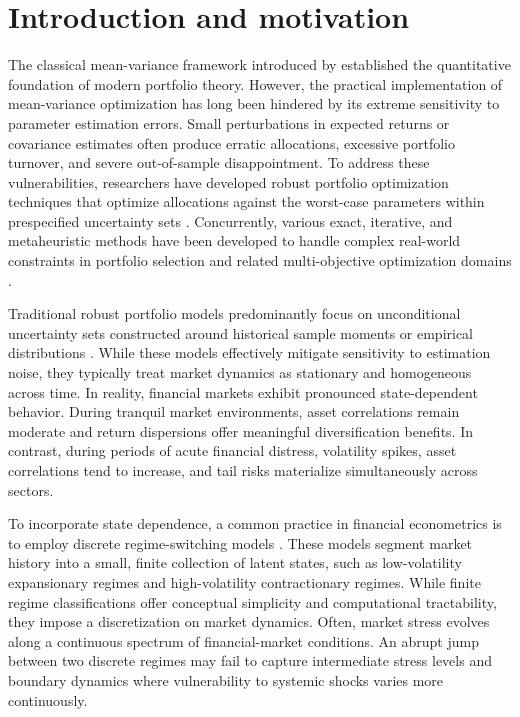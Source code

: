 \documentclass[11pt, a4paper]{article}
\begin{document}
\section{Introduction and motivation}
The classical mean-variance framework introduced by \citet{markowitz1952portfolio} established the quantitative foundation of modern portfolio theory. However, the practical implementation of mean-variance optimization has long been hindered by its extreme sensitivity to parameter estimation errors. Small perturbations in expected returns or covariance estimates often produce erratic allocations, excessive portfolio turnover, and severe out-of-sample disappointment. To address these vulnerabilities, researchers have developed robust portfolio optimization techniques that optimize allocations against the worst-case parameters within prespecified uncertainty sets \citep{goldfarb2003robust, fabozzi2007robust}. Concurrently, various exact, iterative, and metaheuristic methods have been developed to handle complex real-world constraints in portfolio selection and related multi-objective optimization domains \citep{bezoui2019iterative, regaigui2025memetic, bezoui2024hybrid}.

Traditional robust portfolio models predominantly focus on unconditional uncertainty sets constructed around historical sample moments or empirical distributions \citep{delage2010distributionally, esfahani2018data}. While these models effectively mitigate sensitivity to estimation noise, they typically treat market dynamics as stationary and homogeneous across time. In reality, financial markets exhibit pronounced state-dependent behavior. During tranquil market environments, asset correlations remain moderate and return dispersions offer meaningful diversification benefits. In contrast, during periods of acute financial distress, volatility spikes, asset correlations tend to increase, and tail risks materialize simultaneously across sectors.

To incorporate state dependence, a common practice in financial econometrics is to employ discrete regime-switching models \citep{ang2002international}. These models segment market history into a small, finite collection of latent states, such as low-volatility expansionary regimes and high-volatility contractionary regimes. While finite regime classifications offer conceptual simplicity and computational tractability, they impose a discretization on market dynamics. Often, market stress evolves along a continuous spectrum of financial-market conditions. An abrupt jump between two discrete regimes may fail to capture intermediate stress levels and boundary dynamics where vulnerability to systemic shocks varies more continuously.
\end{document}
